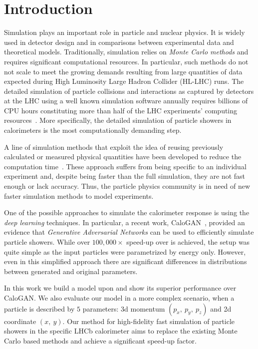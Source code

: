 \section{Introduction}

Simulation plays an important role in particle and nuclear physics. It is widely used in detector design and in comparisons between experimental data and theoretical models. Traditionally, simulation relies on \textit{Monte Carlo methods} and requires significant computational resources. In particular, such methods do not not scale to meet the growing demands resulting from large quantities of data expected during High Luminosity Large Hadron Collider (HL-LHC) runs. The detailed simulation of particle collisions and interactions as captured by detectors at the LHC using a well known simulation software \geant annually requires billions of CPU hours constituting more than half of the LHC experiments' computing resources~\cite{bozzi2014,flynn2015computing}. More specifically, the detailed simulation of particle showers in calorimeters is the most computationally demanding step.
 
A line of simulation methods that exploit the idea of reusing previously calculated or measured physical quantities have been developed to reduce the computation time~\cite{grindhammer2000parameterized,atlas2010simulation}. These approach suffers from being specific to an individual experiment and, despite being faster than the full simulation, they are not fast enough or lack accuracy. Thus, the particle physics community is in need of new faster simulation methods to model experiments. 
    
One of the possible approaches to simulate the calorimeter response is using the \textit{deep learning} techniques. In particular, a recent work, CaloGAN~\cite{paganini2017calogan}, provided an evidence that \textit{Generative Adversarial Networks} can be used to efficiently simulate particle showers. While over $100,000 \times$ speed-up over \geant is achieved, the setup was quite simple as the input particles were parametrized by energy only. However,  even in this simplified approach there are significant differences in distributions between generated and original parameters. 

In this work we build a model upon  and show its superior performance over CaloGAN. We also evaluate our model in a more complex scenario, when a particle is described by $5$ parameters: 3d momentum $(p_x,~ p_y,~ p_z)$ and 2d coordinate $(x,~ y)$. Our method for high-fidelity fast simulation of particle showers in the specific LHCb calorimeter aims to replace the existing Monte Carlo based methods and achieve a significant speed-up factor.
 


